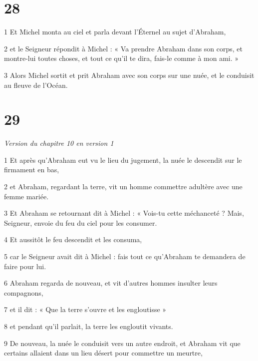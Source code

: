 \chapter{28}

\par 1 Et Michel monta au ciel et parla devant l'Éternel au sujet d'Abraham,

\par 2 et le Seigneur répondit à Michel : « Va prendre Abraham dans son corps, et montre-lui toutes choses, et tout ce qu'il te dira, fais-le comme à mon ami. »

\par 3 Alors Michel sortit et prit Abraham avec son corps sur une nuée, et le conduisit au fleuve de l'Océan.

\chapter{29}

\par \textit{Version du chapitre 10 en version 1}

\par 1 Et après qu'Abraham eut vu le lieu du jugement, la nuée le descendit sur le firmament en bas,

\par 2 et Abraham, regardant la terre, vit un homme commettre adultère avec une femme mariée.

\par 3 Et Abraham se retournant dit à Michel : « Vois-tu cette méchanceté ? Mais, Seigneur, envoie du feu du ciel pour les consumer.

\par 4 Et aussitôt le feu descendit et les consuma,

\par 5 car le Seigneur avait dit à Michel : fais tout ce qu'Abraham te demandera de faire pour lui.

\par 6 Abraham regarda de nouveau, et vit d'autres hommes insulter leurs compagnons,

\par 7 et il dit : « Que la terre s'ouvre et les engloutisse »

\par 8 et pendant qu'il parlait, la terre les engloutit vivants.

\par 9 De nouveau, la nuée le conduisit vers un autre endroit, et Abraham vit que certains allaient dans un lieu désert pour commettre un meurtre,

